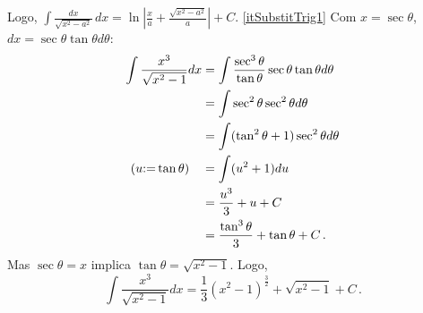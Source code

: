\begin{exo}
\begin{sol}
\begin{center}
\begin{bmlimage}
\end{bmlimage}
\end{center}
Logo,
$\int
\frac{dx}{\sqrt{x^2-a^2}}\,dx=\ln|\tfrac{x}{a}+\tfrac{\sqrt{x^2-a^2}}{a}|+C$.
\eqref{itSubstitTrig1}
Com $x=\sec \theta$, $dx=\sec \theta\tan \theta
d\theta$:
\begin{align*}
\int\frac{x^3}{\sqrt{x^2-1}}dx&=\int 
\frac{\sec^3\theta}{\tan \theta}\sec \theta\tan \theta d\theta\\
&=\int \sec^2\theta \sec^2\theta d\theta\\
&=\int (\tan^2\theta+1)\sec^2\theta d\theta\\
(u{:=} \tan \theta)\quad&=\int (u^2+1)du\\
&=\frac{u^3}{3}+u+C\\
&=\frac{\tan^3\theta}{3}+\tan\theta+C\,.
\end{align*}
Mas $\sec \theta=x$ implica $\tan\theta=\sqrt{x^2-1}$.
Logo,
$$
\int\frac{x^3}{\sqrt{x^2-1}}dx=
\frac{1}{3}(x^2-1)^{\tfrac32}+\sqrt{x^2-1}+C\,.
$$

\end{sol}
\end{exo}





